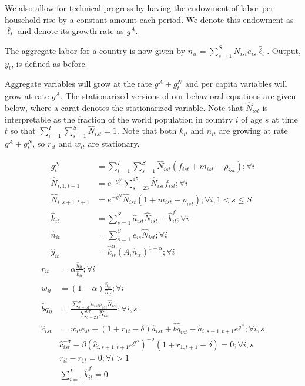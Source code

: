 \documentclass[letterpaper,12pt]{article}
\theoremstyle{definition}
\numberwithin{equation}{section}
\begin{document}
\begin{spacing}{1.5}
	We also allow for technical progress by having the endowment of labor per household rise by a constant amount each period.  We denote this endowment as $\bar \ell_t$ and denote its growth rate as $g^A$.

	The aggregate labor for a country is now given by $n_{it} = \sum_{s=1}^S N_{ist} e_{is} \bar \ell_t$.  Output, $y_t$, is defined as before. 

	Aggregate variables will grow at the rate $g^A+g^N_t$ and per capita variables will grow at rate $g^A$.  The stationarized versions of our behavioral equations are given below, where a carat denotes the stationarized variable.  Note that $\hat N_{ist}$ is interpretable as the fraction of the world population in country $i$ of age $s$ at time $t$ so that $\sum_{i=1}^I \sum_{s=1}^S \hat N_{ist} = 1$.  Note that both $k_{it}$ and $n_{it}$ are growing at rate $g^A+g^N_t$, so $r_{it}$ and $w_{it}$ are stationary.

	\begin{align}
		g^N_t & = \sum_{i=1}^I \sum_{s=1}^S \hat N_{ist} (f_{ist}+m_{ist}-\rho_{ist}) ; \forall i\\
		\hat N_{i,1,t+1} & = e^{-g^N_t}\sum_{s=23}^{45} \hat N_{ist} f_{ist} ; \forall i\\
		\hat N_{i,s+1,t+1} & = e^{-g^N_t}\hat N_{ist} (1+m_{ist}-\rho_{ist}); \forall i, 1<s\le S \\
		\hat k_{it} & = \sum_{s=1}^S \hat a_{ist} \hat N_{ist} - \hat k_{it}^f; \forall i \\
		\hat n_{it} & = \sum_{s=1}^S e_{is} \hat N_{ist}; \forall i \\
		\hat y_{it} & = \hat k_{it}^\alpha \left( A_{i} \hat n_{it} \right)^{1-\alpha} ; \forall i
	\end{align}
	\begin{align}
		r_{it} & = \alpha \frac{\hat y_{it}}{\hat k_{it}}; \forall i \\
		w_{it} & = (1-\alpha) \frac{\hat y_{it}}{\hat n_{it}}; \forall i \\
		\hat bq_{it} & = \frac{\sum_{s=67}^S \hat a_{ist} \rho_{ist} \hat N_{ist}}{\sum_{s=23}^{67} \hat N_{ist}} ; \forall i,s \\
	    \hat c_{ist} & = w_{it} e_{st} + (1+r_{1t}-\delta)\hat a_{ist} + \hat{bq}_{ist} - \hat a_{i,s+1,t+1}e^{g^A} ; \forall i,s \\
		& \hat c_{ist}^{-\sigma} - \beta \left(\hat c_{i,s+1,t+1} e^{g^A}\right)^{-\sigma}(1+r_{1,t+1}-\delta) = 0; \forall i,s \\ 
		& r_{it} - r_{1t} = 0; \forall i>1 \\
		& \sum_{i=1}^I \hat k^f_{it} = 0
	\end{align}


\end{spacing}
\end{document}
